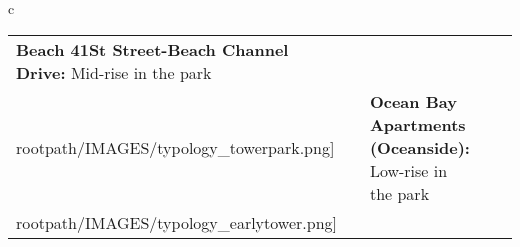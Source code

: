 \begin{table}[H]
        \begin{tabular}{c}
        \begin{tabular}{m{1.25in} m{2in} m{.1in} m{1.25in} m{2in}}
\textbf{Beach 41St Street-Beach Channel Drive:} {Mid-rise in the park} & \texttt{[image: \\rootpath/IMAGES/typology\_towerpark.png]} & & \textbf{Ocean Bay Apartments (Oceanside):} {Low-rise in the park} & \texttt{[image: \\rootpath/IMAGES/typology\_earlytower.png]}
\end{tabular}\end{tabular}
        \end{table}